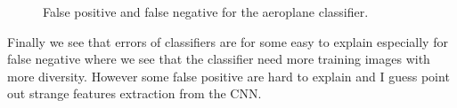 \documentclass[a4paper,11pt]{exam}
\begin{document}
\begin{figure}[!h]%
    \centering
    \qquad
    \caption{False positive and false negative for the aeroplane classifier.}%
    \label{aeroplanebad}%
\end{figure}

Finally we see that errors of classifiers are for some easy to explain especially for false negative where we see that the classifier need more training images with more diversity. However some false positive are hard to explain and I guess point out strange features extraction from the CNN.







\end{document}
